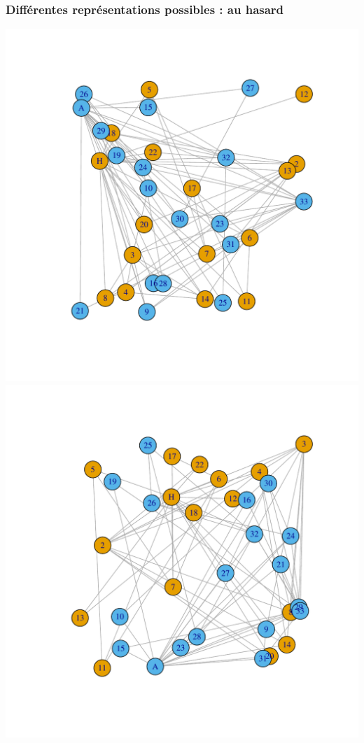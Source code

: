 \documentclass[nopagenumber,9pt]{beamer}
\begin{document}
\begin{frame}
 \frametitle{Différentes représentations possibles : au hasard}
 
 \begin{center}
 \includegraphics[scale=.3]{plots/karateRandom1.pdf}
  \includegraphics[scale=.3]{plots/karateRandom2.pdf}
  
 \end{center}
 
\end{frame}
\end{document}
